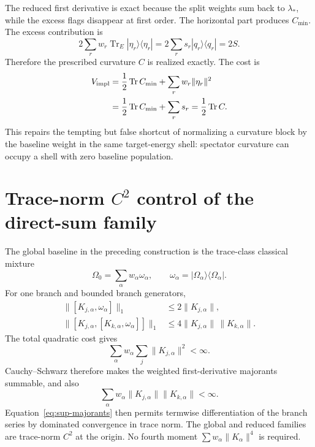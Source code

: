 \documentclass[aps,pra,preprint,nofootinbib]{revtex4-2}
\newcommand{\Tr}{\operatorname{Tr}}
\newcommand{\Omegazero}{\Omega_0}
\newcommand{\Cmin}{C_{\min}}
\newcommand{\Cker}{C}
\newcommand{\Vimpl}{V_{\rm impl}}
\begin{document}
The reduced first derivative is exact because the split weights sum back to $\lambda_*$, while the excess flags disappear at first order. The horizontal part produces $\Cmin$. The excess contribution is
\begin{equation}
 2\sum_rw_r\Tr_E|\eta_r\rangle\langle\eta_r|
 =2\sum_rs_r|q_r\rangle\langle q_r|=2S.
\end{equation}
Therefore the prescribed curvature $\Cker$ is realized exactly. The cost is
\begin{align}
 \Vimpl
 &=\frac12\Tr\Cmin+\sum_rw_r\|\eta_r\|^2\\
 &=\frac12\Tr\Cmin+\sum_rs_r
 =\frac12\Tr\Cker.
 \label{eq:sup-energycost}
\end{align}
This repairs the tempting but false shortcut of normalizing a curvature block by the baseline weight in the same target-energy shell: spectator curvature can occupy a shell with zero baseline population.

\section{Trace-norm $C^2$ control of the direct-sum family}

The global baseline in the preceding construction is the trace-class classical mixture
\begin{equation}
 \Omegazero=\sum_\alpha w_\alpha\omega_\alpha,
 \qquad \omega_\alpha=|\Omega_\alpha\rangle\langle\Omega_\alpha|.
\end{equation}
For one branch and bounded branch generators,
\begin{align}
 \|[K_{j,\alpha},\omega_\alpha]\|_1
 &\le2\|K_{j,\alpha}\|,\\
 \|[K_{j,\alpha},[K_{k,\alpha},\omega_\alpha]]\|_1
 &\le4\|K_{j,\alpha}\|\,\|K_{k,\alpha}\|.
 \label{eq:sup-majorants}
\end{align}
The total quadratic cost gives
\begin{equation}
 \sum_\alpha w_\alpha\sum_j\|K_{j,\alpha}\|^2<\infty.
\end{equation}
Cauchy--Schwarz therefore makes the weighted first-derivative majorants summable, and also
\begin{equation}
 \sum_\alpha w_\alpha\|K_{j,\alpha}\|\|K_{k,\alpha}\|<\infty.
\end{equation}
Equation~\eqref{eq:sup-majorants} then permits termwise differentiation of the branch series by dominated convergence in trace norm. The global and reduced families are trace-norm $C^2$ at the origin. No fourth moment $\sum w_\alpha\|K_\alpha\|^4$ is required.
\end{document}
